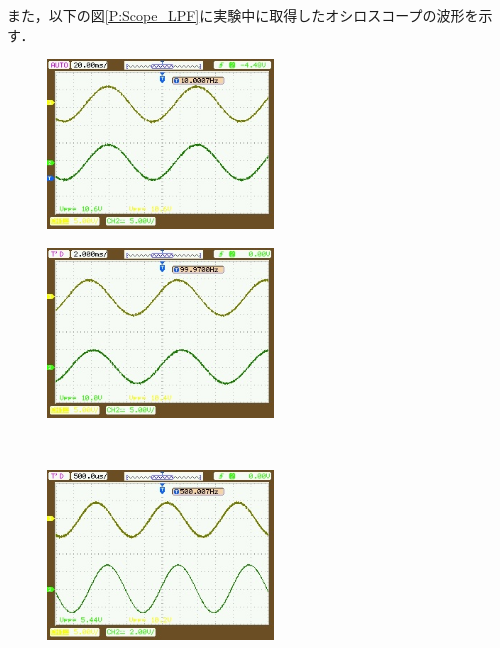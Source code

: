 \documentclass[a4paper,11pt]{jsarticle}
\begin{document}
また，以下の図\ref{P:Scope_LPF}に実験中に取得したオシロスコープの波形を示す．
\begin{figure}[H]
  \begin{center}
    \begin{minipage}{0.48\textwidth}
      \begin{center}
        \includegraphics[clip,width=6cm]{picture/LPF/10.jpeg}
      \end{center}
      \label{P:LPF_10}
    \end{minipage}
    \begin{minipage}{0.48\textwidth}
      \begin{center}
        \includegraphics[clip,width=6cm]{picture/LPF/100.jpeg}
      \end{center}
      \label{P:LPF_100}
    \end{minipage} \\
    \begin{minipage}{0.48\textwidth}
      \begin{center}
        \includegraphics[clip,width=6cm]{picture/LPF/500.jpeg}
      \end{center}

\end{minipage}
\end{center}
\end{figure}
\end{document}
